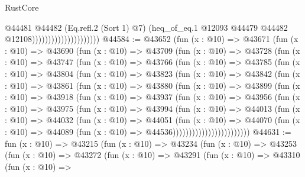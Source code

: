\begin{lexlean}{RustCore}
\begin{coremodule}
                                          @44481
                                            @44482
                                            (Eq.refl.{2} (Sort 1) @7)
                                            (heq_of_eq.{1}
                                              @12093
                                              @44479
                                              @44482
                                              @12108)))))))))))))))))))))
@44584 := @43652
    (fun (x : @10) =>
    @43671
      (fun (x : @10) =>
      @43690
        (fun (x : @10) =>
        @43709
          (fun (x : @10) =>
          @43728
            (fun (x : @10) =>
            @43747
              (fun (x : @10) =>
              @43766
                (fun (x : @10) =>
                @43785
                  (fun (x : @10) =>
                  @43804
                    (fun (x : @10) =>
                    @43823
                      (fun (x : @10) =>
                      @43842
                        (fun (x : @10) =>
                        @43861
                          (fun (x : @10) =>
                          @43880
                            (fun (x : @10) =>
                            @43899
                              (fun (x : @10) =>
                              @43918
                                (fun (x : @10) =>
                                @43937
                                  (fun (x : @10) =>
                                  @43956
                                    (fun (x : @10) =>
                                    @43975
                                      (fun (x : @10) =>
                                      @43994
                                        (fun (x : @10) =>
                                        @44013
                                          (fun (x : @10) =>
                                          @44032
                                            (fun (x : @10) =>
                                            @44051
                                              (fun (x : @10) =>
                                              @44070
                                                (fun (x : @10) =>
                                                @44089
                                                  (fun (x : @10) => @44536))))))))))))))))))))))))
@44631 := fun (x : @10) =>
  @43215
    (fun (x : @10) =>
    @43234
      (fun (x : @10) =>
      @43253
        (fun (x : @10) =>
        @43272
          (fun (x : @10) =>
          @43291
            (fun (x : @10) =>
            @43310
              (fun (x : @10) =>

\end{coremodule}
\end{lexlean}
